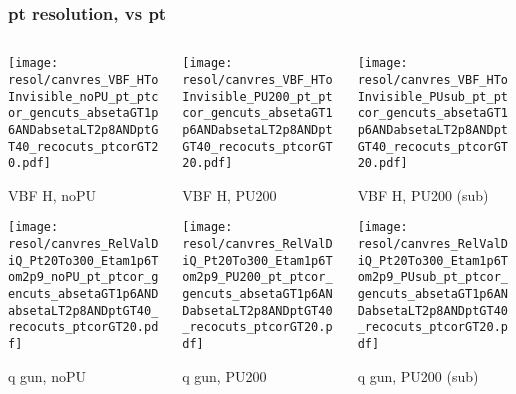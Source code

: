 \documentclass[8pt]{beamer}
\begin{document}
  \begin{frame}
  \frametitle{pt resolution, vs pt}
  
  \begin{columns}
   \begin{column}{0.35\textwidth}
     \texttt{[image: resol/canvres\_VBF\_HToInvisible\_noPU\_pt\_ptcor\_gencuts\_absetaGT1p6ANDabsetaLT2p8ANDptGT40\_recocuts\_ptcorGT20.pdf]}
     
     VBF H, noPU
    
     \texttt{[image: resol/canvres\_RelValDiQ\_Pt20To300\_Etam1p6Tom2p9\_noPU\_pt\_ptcor\_gencuts\_absetaGT1p6ANDabsetaLT2p8ANDptGT40\_recocuts\_ptcorGT20.pdf]}
     
     q gun, noPU
   \end{column}
   \begin{column}{0.35\textwidth}
     \texttt{[image: resol/canvres\_VBF\_HToInvisible\_PU200\_pt\_ptcor\_gencuts\_absetaGT1p6ANDabsetaLT2p8ANDptGT40\_recocuts\_ptcorGT20.pdf]}
     
     VBF H, PU200
    
     \texttt{[image: resol/canvres\_RelValDiQ\_Pt20To300\_Etam1p6Tom2p9\_PU200\_pt\_ptcor\_gencuts\_absetaGT1p6ANDabsetaLT2p8ANDptGT40\_recocuts\_ptcorGT20.pdf]}
     
     q gun, PU200
   \end{column}
   \begin{column}{0.35\textwidth}
     \texttt{[image: resol/canvres\_VBF\_HToInvisible\_PUsub\_pt\_ptcor\_gencuts\_absetaGT1p6ANDabsetaLT2p8ANDptGT40\_recocuts\_ptcorGT20.pdf]}
     
     VBF H, PU200 (sub)
    
     \texttt{[image: resol/canvres\_RelValDiQ\_Pt20To300\_Etam1p6Tom2p9\_PUsub\_pt\_ptcor\_gencuts\_absetaGT1p6ANDabsetaLT2p8ANDptGT40\_recocuts\_ptcorGT20.pdf]}
     
     q gun, PU200 (sub)
   \end{column}
  \end{columns}
 \end{frame}
 
\end{document}
